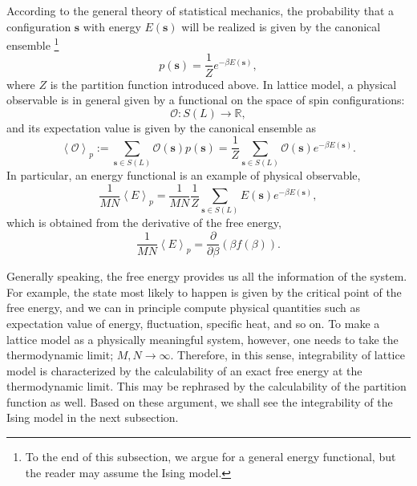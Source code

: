 According to the general theory of statistical mechanics, the probability
that a configuration $\mathbf{s}$ with energy $E\left(\mathbf{s}\right)$
will be realized is given by the canonical ensemble%
%
\footnote{To the end of this subsection, we argue for a general energy functional,
but the reader may assume the Ising model. }
%
\begin{equation}
p\left(\mathbf{s}\right)  =  \frac{1}{Z}e^{-\beta E\left(\mathbf{s}\right)},
\end{equation}
 where $Z$ is the partition function introduced above. In lattice
model, a physical observable is in general given by a functional on
the space of spin configurations:
\begin{equation}
  \mathcal{O}  :  S\left(L\right)  \longrightarrow  \mathbb{R},
\end{equation}
and its expectation value is given by the canonical ensemble as
\begin{equation}
\left\langle \mathcal{O}\right\rangle _{p}
  :=\sum_{\mathbf{s}\in S\left(L\right)}\mathcal{O}\left(\mathbf{s}\right)p\left(\mathbf{s}\right)
    =\frac{1}{Z}\sum_{\mathbf{s}\in S\left(L\right)}\mathcal{O}\left(\mathbf{s}\right)e^{-\beta E\left(\mathbf{s}\right)}.
\end{equation}
 In particular, an energy functional is an example of physical observable,
\begin{equation}
\frac{1}{MN}\left\langle E\right\rangle _{p}
  =\frac{1}{MN}\frac{1}{Z}\sum_{\mathbf{s}\in S\left(L\right)}E\left(\mathbf{s}\right)e^{-\beta E\left(\mathbf{s}\right)},
\end{equation}
 which is obtained from the derivative of the free energy,
\begin{equation}
\frac{1}{MN}\left\langle E\right\rangle _{p}=\frac{\partial}{\partial\beta}\left(\beta f\left(\beta\right)\right).
\end{equation}

Generally speaking, the free energy provides us all the information
of the system. For example, the state most likely to happen is given
by the critical point of the free energy, and we can in principle
compute physical quantities such as expectation value of energy, fluctuation,
specific heat, and so on. To make a lattice model as a physically
meaningful system, however, one needs to take the thermodynamic limit;
$M,N\rightarrow\infty$. Therefore, in this sense, integrability of
lattice model is characterized by the calculability of an exact free
energy at the thermodynamic limit. This may be rephrased by the calculability
of the partition function as well. Based on these argument, we shall
see the integrability of the Ising model in the next subsection.





